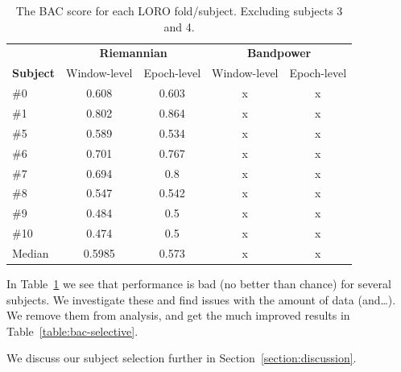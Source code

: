         \begin{table}[h]
            \centering
            \begin{tabular}{lcccc}
                \toprule
                & \multicolumn{2}{c}{\textbf{Riemannian}} & \multicolumn{2}{c}{\textbf{Bandpower}} \\
                \cmidrule(lr){2-3}
                \cmidrule(lr){4-5}
                \textbf{Subject} & Window-level & Epoch-level & Window-level & Epoch-level \\
                \midrule
                \#0  & 0.608  & 0.603 & x & x \\
                \#1  & 0.802  & 0.864 & x & x \\
                \#5  & 0.589  & 0.534 & x & x \\
                \#6  & 0.701  & 0.767 & x & x \\
                \#7  & 0.694  & 0.8   & x & x \\
                \#8  & 0.547  & 0.542 & x & x \\
                \#9  & 0.484  & 0.5   & x & x \\
                \#10 & 0.474  & 0.5   & x & x \\
                \midrule
                Median & 0.5985 & 0.573 & x & x \\
                \bottomrule
            \end{tabular}
            \caption{The BAC score for each LORO fold/subject. Excluding subjects 3 and 4.}\label{table:bac-all}
        \end{table}

        In Table~\ref{table:bac-all} we see that performance is bad (no better than chance) for several subjects. We investigate these and find issues with the amount of data (and\ldots). We remove them from analysis, and get the much improved results in Table~\ref{table:bac-selective}.

        We discuss our subject selection further in Section~\ref{section:discussion}.

